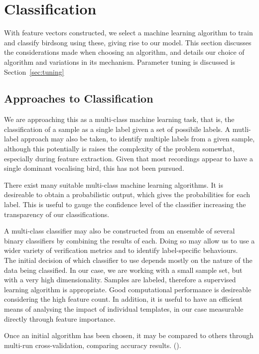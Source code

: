 \section{Classification}
With feature vectors constructed, we select a machine learning algorithm to
train and classify birdsong using these, giving rise to our model.
This section discusses the considerations made when choosing an algorithm,
and details our choice of algorithm and variations in its mechanism.
Parameter tuning is discussed is Section~\ref{sec:tuning}

\subsection{Approaches to Classification}\label{sec:clfapp}
We are approaching this as a multi-class machine learning task, that is, the
classification of a sample as a single label given a set of possibile labels.
A mutli-label approach may also be taken, to identify multiple labels from a
given sample, although this potentially is raises the complexity of the problem
somewhat, especially during feature extraction.
Given that most recordings appear to have a single dominant vocalising
bird, this has not been pursued.

There exist many suitable multi-class machine learning algorithms.
It is desireable to obtain a probabilistic output, which gives the probabilities
for each label.
This is useful to gauge the confidence level of the classifier increasing the
transparency of our classifications.

A multi-class classifier may also be constructed from an ensemble of several
binary classifiers by combining the results of each.
Doing so may allow us to use a wider variety of verification metrics and to
identify label-specific behaviours.\\

The initial decision of which classifier to use depends mostly on the nature
of the data being classified.
In our case, we are working with a small sample set, but with a very high 
dimensionality.
Samples are labeled, therefore a supervised learning algorithm is appropriate.
Good computational performance is desireable considering the high feature count.
In addition, it is useful to have an efficient means of analysing the impact of
individual templates, in our case measurable directly through feature importance.

Once an initial algorithm has been chosen, it may be compared to others through
multi-run cross-validation, comparing accuracy results.
(\textcite{Bouckaert2003}).



